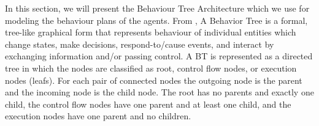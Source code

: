 \documentclass[journal]{IEEEtran}
\theoremstyle{definition}
\newcommand\patrizio[1]{\nb{Patrizio}{#1}}
\begin{document}
In this section, we will present the Behaviour Tree Architecture which we use for modeling the behaviour plans of the agents.
From \cite{dromey2003requirements}, A Behavior Tree is a formal, tree-like graphical form that
represents behaviour of individual entities
which change states, make decisions, respond-to/cause events, and interact by exchanging information and/or passing control.
A BT is represented as a directed tree in which the nodes are classified as root, control flow nodes, or execution nodes (leafs). For each pair of connected nodes the outgoing node is the parent and the incoming node is the child node. The root has no parents and exactly one child, the control flow nodes have one parent and at least one child, and the execution nodes have one parent and no children. 

\end{document}
